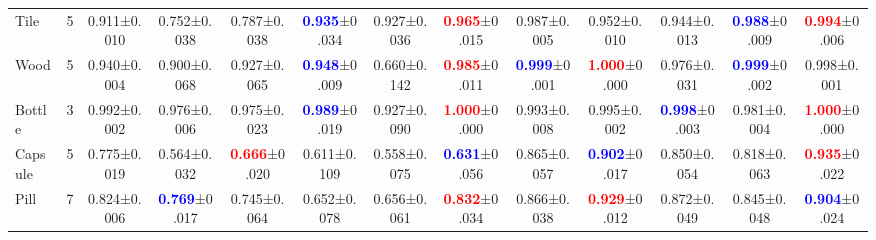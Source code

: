 \documentclass[10pt,twocolumn,letterpaper]{article}
\begin{document}
\begin{table*}[bt]
{\begin{tabular}{l@{}|c ||c||ccccc||ccccc}
    Tile & 5& 0.911\footnotesize{±0.010}& 0.752\footnotesize{±0.038}& 0.787\footnotesize{±0.038}& \textcolor{blue}{\textbf{0.935}}\footnotesize{±0.034}& 0.927\footnotesize{±0.036}& \textcolor{red}{\textbf{0.965}}\footnotesize{±0.015}& 0.987\footnotesize{±0.005}& 0.952\footnotesize{±0.010}& 0.944\footnotesize{±0.013}& \textcolor{blue}{\textbf{0.988}}\footnotesize{±0.009}& \textcolor{red}{\textbf{0.994}}\footnotesize{±0.006} \\
    
    Wood & 5& 0.940\footnotesize{±0.004}& 0.900\footnotesize{±0.068}& 0.927\footnotesize{±0.065}& \textcolor{blue}{\textbf{0.948}}\footnotesize{±0.009}& 0.660\footnotesize{±0.142}& \textcolor{red}{\textbf{0.985}}\footnotesize{±0.011}& \textcolor{blue}{\textbf{0.999}}\footnotesize{±0.001}& \textcolor{red}{\textbf{1.000}}\footnotesize{±0.000}& 0.976\footnotesize{±0.031}& \textcolor{blue}{\textbf{0.999}}\footnotesize{±0.002}& 0.998\footnotesize{±0.001} \\

    Bottle & 3& 0.992\footnotesize{±0.002}& 0.976\footnotesize{±0.006}& 0.975\footnotesize{±0.023}& \textcolor{blue}{\textbf{0.989}}\footnotesize{±0.019}& 0.927\footnotesize{±0.090}& \textcolor{red}{\textbf{1.000}}\footnotesize{±0.000}& 0.993\footnotesize{±0.008}& 0.995\footnotesize{±0.002}& \textcolor{blue}{\textbf{0.998}}\footnotesize{±0.003}& 0.981\footnotesize{±0.004}& \textcolor{red}{\textbf{1.000}}\footnotesize{±0.000} \\
    
    Capsule & 5& 0.775\footnotesize{±0.019}& 0.564\footnotesize{±0.032}& \textcolor{red}{\textbf{0.666}}\footnotesize{±0.020}& 0.611\footnotesize{±0.109}& 0.558\footnotesize{±0.075}& \textcolor{blue}{\textbf{0.631}}\footnotesize{±0.056}& 0.865\footnotesize{±0.057}& \textcolor{blue}{\textbf{0.902}}\footnotesize{±0.017}& 0.850\footnotesize{±0.054}& 0.818\footnotesize{±0.063}& \textcolor{red}{\textbf{0.935}}\footnotesize{±0.022} \\
    
    Pill & 7& 0.824\footnotesize{±0.006}& \textcolor{blue}{\textbf{0.769}}\footnotesize{±0.017}& 0.745\footnotesize{±0.064}& 0.652\footnotesize{±0.078}& 0.656\footnotesize{±0.061}& \textcolor{red}{\textbf{0.832}}\footnotesize{±0.034}& 0.866\footnotesize{±0.038}& \textcolor{red}{\textbf{0.929}}\footnotesize{±0.012}& 0.872\footnotesize{±0.049}& 0.845\footnotesize{±0.048}& \textcolor{blue}{\textbf{0.904}}\footnotesize{±0.024} \\
    

\end{tabular}}
\end{table*}
\end{document}
